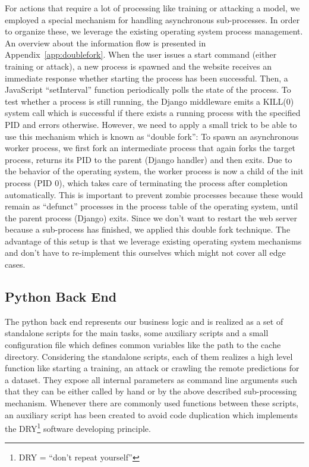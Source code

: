 For actions that require a lot of processing like training or attacking a model, we employed a special mechanism for handling asynchronous sub-processes.
In order to organize these, we leverage the existing operating system process management.
An overview about the information flow is presented in Appendix~\ref{app:doublefork}.
When the user issues a start command (either training or attack), a new process is spawned and the website receives an immediate response whether starting the process has been successful.
Then, a JavaScript \enquote{setInterval} function periodically polls the state of the process.
To test whether a process is still running, the Django middleware emits a KILL(0) system call which is successful if there exists a running process with the specified PID and errors otherwise.
However, we need to apply a small trick to be able to use this mechanism which is known as \enquote{double fork}: To spawn an asynchronous worker process, we first fork an intermediate process that again forks the target process, returns its PID to the parent (Django handler) and then exits.
Due to the behavior of the operating system, the worker process is now a child of the init process (PID 0), which takes care of terminating the process after completion automatically.
This is important to prevent zombie processes because these would remain as \enquote{defunct} processes in the process table of the operating system, until the parent process (Django) exits.
Since we don't want to restart the web server because a sub-process has finished, we applied this double fork technique.
The advantage of this setup is that we leverage existing operating system mechanisms and don't have to re-implement this ourselves which might not cover all edge cases.

\subsection{Python Back End}\label{subsec:backend}
The python back end represents our business logic and is realized as a set of standalone scripts for the main tasks, some auxiliary scripts and a small configuration file which defines common variables like the path to the cache directory.
Considering the standalone scripts, each of them realizes a high level function like starting a training, an attack or crawling the remote predictions for a dataset.
They expose all internal parameters as command line arguments such that they can be either called by hand or by the above described sub-processing mechanism.
Whenever there are commonly used functions between these scripts, an auxiliary script has been created to avoid code duplication which implements the DRY\footnote{DRY = \enquote{don't repeat yourself}} software developing principle.

